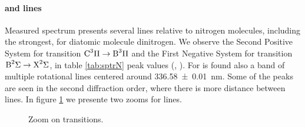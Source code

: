 \paragraph{ and  lines}
Measured spectrum presents several lines relative to nitrogen molecules, including the strongest, for diatomic molecule dinitrogen. We observe the Second Positive System for  transition $\ce{C^3\Pi} \rightarrow \ce{B^3\Pi}$ and the First Negative System for  transition $\ce{B^2\Sigma} \rightarrow \ce{X^2\Sigma}$, in table \ref{tab:sptrN} peak values (\cite{N2lab}, \cite{Britun_2007}). For  is found also a band of multiple rotational lines centered around \SI{336.58(1)}{\nano\meter}.
Some of the peaks are seen in the second diffraction order, where there is more distance between lines. In figure \ref{fig:N2} we presente two zooms for  lines.
\begin{figure}
 \centering
 \hfill
 \caption{Zoom on  transitions.}
 \label{fig:N2}
\end{figure}

